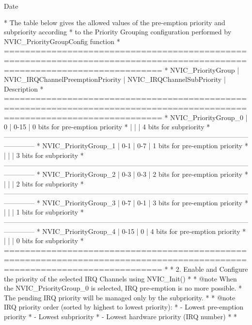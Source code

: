 \begin{DoxyDate}{Date}
\begin{DoxyVerb}
*  The table below gives the allowed values of the pre-emption priority and subpriority according
*  to the Priority Grouping configuration performed by NVIC_PriorityGroupConfig function
*    ==========================================================================================================================
*      NVIC_PriorityGroup   | NVIC_IRQChannelPreemptionPriority | NVIC_IRQChannelSubPriority  |       Description
*    ==========================================================================================================================
*     NVIC_PriorityGroup_0  |                0                  |            0-15             | 0 bits for pre-emption priority
*                           |                                   |                             | 4 bits for subpriority
*    --------------------------------------------------------------------------------------------------------------------------
*     NVIC_PriorityGroup_1  |                0-1                |            0-7              | 1 bits for pre-emption priority
*                           |                                   |                             | 3 bits for subpriority
*    --------------------------------------------------------------------------------------------------------------------------    
*     NVIC_PriorityGroup_2  |                0-3                |            0-3              | 2 bits for pre-emption priority
*                           |                                   |                             | 2 bits for subpriority
*    --------------------------------------------------------------------------------------------------------------------------    
*     NVIC_PriorityGroup_3  |                0-7                |            0-1              | 3 bits for pre-emption priority
*                           |                                   |                             | 1 bits for subpriority
*    --------------------------------------------------------------------------------------------------------------------------    
*     NVIC_PriorityGroup_4  |                0-15               |            0                | 4 bits for pre-emption priority
*                           |                                   |                             | 0 bits for subpriority                       
*    ==========================================================================================================================     
*
*            2. Enable and Configure the priority of the selected IRQ Channels using NVIC_Init()  
*
* @note  When the NVIC_PriorityGroup_0 is selected, IRQ pre-emption is no more possible. 
*        The pending IRQ priority will be managed only by the subpriority.
*
* @note  IRQ priority order (sorted by highest to lowest priority):
*         - Lowest pre-emption priority
*         - Lowest subpriority
*         - Lowest hardware priority (IRQ number)
*
*  \end{DoxyVerb}

\end{DoxyDate}
